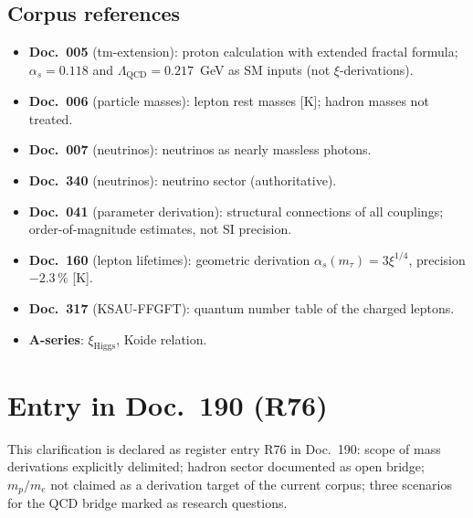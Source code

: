 \subsection{Corpus references}

\begin{itemize}
  \item \textbf{Doc.~005} (tm-extension): proton calculation with
    extended fractal formula; $\alpha_s = 0.118$ and
    $\Lambda_{\mathrm{QCD}} = 0.217$~GeV as SM inputs (not $\xi$-derivations).
  \item \textbf{Doc.~006} (particle masses): lepton rest masses [K];
    hadron masses not treated.
  \item \textbf{Doc.~007} (neutrinos): neutrinos as nearly massless
    photons.
  \item \textbf{Doc.~340} (neutrinos): neutrino sector (authoritative).
  \item \textbf{Doc.~041} (parameter derivation): structural connections
    of all couplings; order-of-magnitude estimates, not SI precision.
  \item \textbf{Doc.~160} (lepton lifetimes): geometric derivation
    $\alpha_s(m_\tau) = 3\xi^{1/4}$, precision $-2.3\,\%$ [K].
  \item \textbf{Doc.~317} (KSAU-FFGFT): quantum number table of the charged leptons.
  \item \textbf{A-series}: $\xi_{\mathrm{Higgs}}$, Koide relation.
\end{itemize}

\section{Entry in Doc.~190 (R76)}

This clarification is declared as register entry R76 in Doc.~190:
scope of mass derivations explicitly delimited; hadron sector documented
as open bridge; $m_p/m_e$ not claimed as a derivation target of the
current corpus; three scenarios for the QCD bridge marked as research
questions.
